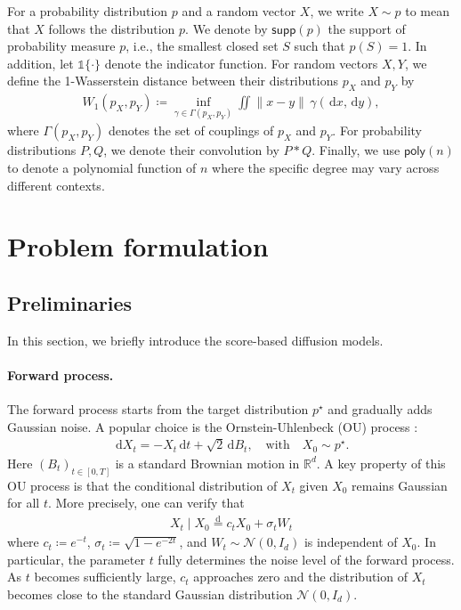 \documentclass{article}
\newcommand{\defn}{\coloneqq}
\newcommand{\diff}{\,\mathrm{d}}
\newcommand{\disteq}{\overset{\mathrm d}=}
\newcommand{\supp}{\mathsf{supp}}
\theoremstyle{plain}
\theoremstyle{remark}
\begin{document}
For a probability distribution $p$ and a random vector $X$, we write $X \sim p$ to mean that $X$ follows the distribution $p$. We denote by $\supp(p)$ the support of probability measure $p$, i.e., the smallest closed set $S$ such that $p(S)=1$.
In addition, let $\mathds{1}\{ \cdot \}$ denote the indicator function. 
For random vectors $X, Y$,
we define the 1-Wasserstein distance between their distributions $p_X$ and $p_Y$ by
\begin{align*}
    W_1(p_X,p_Y) \defn \inf_{\gamma \in \Gamma(p_X,p_Y)}\iint \|x-y\| \, \gamma(\!\diff x,\!\diff y),
\end{align*}
where $\Gamma(p_{X},p_{Y})$ denotes the set of couplings of $p_X$ and $p_Y$. 
For probability distributions $P,Q$, we denote their convolution by $P\ast Q$.
Finally, we use $\mathsf{poly}(n)$ to denote a polynomial function of $n$ where the specific degree may vary across different contexts.

\section{Problem formulation}
\label{sec:problem formulation}
\subsection{Preliminaries}
In this section, we briefly introduce the score-based diffusion models.

\paragraph*{Forward process.}
The forward process starts from the target distribution $p^\star$ and gradually adds Gaussian noise.
A popular choice is the Ornstein-Uhlenbeck (OU) process \cite{song2021scorebasedgenerativemodelingstochastic}:
\begin{align}
    \diff X_t = -X_t \diff t + \sqrt{2} \diff B_t, \quad \text{with}\quad X_0 \sim p^\star.  \label{eq:forward SDE}
\end{align}
Here $(B_t)_{t\in [0,T]}$ is a standard Brownian motion in $\mathbb{R}^d$. A key property of this OU process is that the conditional distribution of $X_t$ given $X_0$ remains Gaussian for all $t$. More precisely, one can verify that
\begin{align}
    X_t \mid X_0 \disteq c_t X_0 + \sigma_t W_t \label{eq:forward conditional dist}
\end{align}
where $c_t \defn e^{-t}$, $\sigma_t \defn \sqrt{1-e^{-2t}}$, and $W_t \sim \mathcal{N}(0,I_d)$ is independent of $X_0$. 
In particular, the parameter $t$ fully determines the noise level of the forward process. As $t$ becomes sufficiently large, $c_t$ approaches zero and the distribution of $X_t$ becomes close to the standard Gaussian distribution $\mathcal{N}(0,I_d)$.
\end{document}
